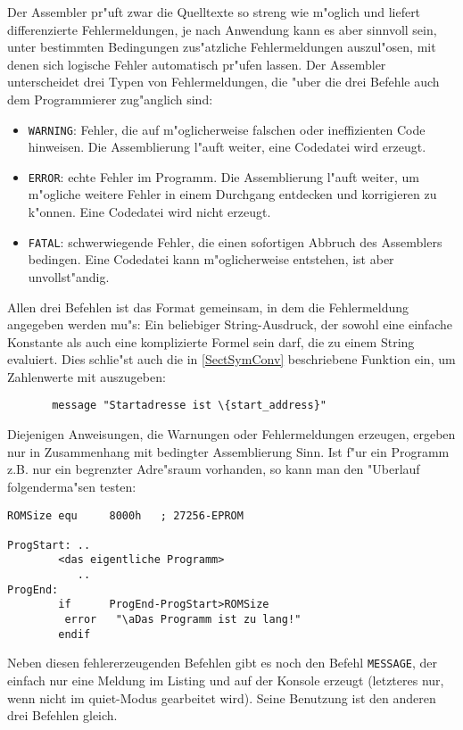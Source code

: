 \documentclass[12pt,a4paper,twoside]{report}
\newcommand{\tty}[1]{{\tt #1}}
\begin{document}
Der Assembler pr"uft zwar die Quelltexte so streng wie m"oglich und
liefert differenzierte Fehlermeldungen, je nach Anwendung kann es
aber sinnvoll sein, unter bestimmten Bedingungen zus"atzliche
Fehlermeldungen auszul"osen, mit denen sich logische Fehler automatisch
pr"ufen lassen.  Der Assembler unterscheidet drei Typen von Fehlermeldungen,
die "uber die drei Befehle auch dem Programmierer zug"anglich sind:
\begin{itemize}
\item{\tty{WARNING}: Fehler, die auf m"oglicherweise falschen oder
      ineffizienten Code hinweisen.  Die Assemblierung l"auft weiter,
      eine Codedatei wird erzeugt.}
\item{\tty{ERROR}: echte Fehler im Programm.  Die Assemblierung l"auft weiter,
      um m"ogliche weitere Fehler in einem Durchgang entdecken und
      korrigieren zu k"onnen.  Eine Codedatei wird nicht erzeugt.}
\item{\tty{FATAL}: schwerwiegende Fehler, die einen sofortigen Abbruch des
      Assemblers bedingen.  Eine Codedatei kann m"oglicherweise entstehen,
      ist aber unvollst"andig.}
\end{itemize}
Allen drei Befehlen ist das Format gemeinsam, in dem die Fehlermeldung
angegeben werden mu"s: Ein beliebiger String-Ausdruck, der sowohl eine einfache
Konstante als auch eine komplizierte Formel sein darf, die zu einem String
evaluiert.  Dies schlie"st auch die in \ref{SectSymConv} beschriebene
Funktion ein, um Zahlenwerte mit auszugeben:
\begin{verbatim}
       message "Startadresse ist \{start_address}"
\end{verbatim}
Diejenigen Anweisungen, die Warnungen oder Fehlermeldungen erzeugen, ergeben
nur in Zusammenhang mit bedingter Assemblierung Sinn.  Ist f"ur ein Programm
z.B. nur ein begrenzter Adre"sraum vorhanden, so kann man den "Uberlauf
folgenderma"sen testen:
\begin{verbatim}
ROMSize equ     8000h   ; 27256-EPROM

ProgStart: ..
        <das eigentliche Programm>
           ..
ProgEnd:
        if      ProgEnd-ProgStart>ROMSize
         error   "\aDas Programm ist zu lang!"
        endif
\end{verbatim}
Neben diesen fehlererzeugenden Befehlen gibt es noch den Befehl
\tty{MESSAGE}, der einfach nur eine Meldung im Listing und auf
der Konsole erzeugt (letzteres nur, wenn nicht im quiet-Modus
gearbeitet wird).  Seine Benutzung ist den anderen drei Befehlen
gleich.
\end{document}
